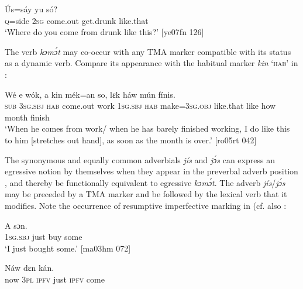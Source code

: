 \ea%
    \label{ex:key:356}
    \gll \'{U}s=sáy  yu      só?\\
\textsc{q}=side  \textsc{2sg}  come.out  get.drunk  like.that\\

\glt ‘Where do you come from drunk like this?’ [ye07fn 126]
\z

The verb \textit{kɔmɔ́t} may co-occur with any TMA marker compatible with its status as a dynamic verb. Compare its appearance with the habitual marker \textit{kin} ‘\textsc{hab}’ in :


\ea%
    \label{ex:key:357}
    \gll Wé  e         wók,  a    kin
mék=an    so,    lɛk  háw  mún    fínis.\\
\textsc{sub}  \textsc{3sg.sbj}  \textsc{hab}  come.out  work  \textsc{1sg.sbj}  \textsc{hab}
make=\textsc{3sg.obj}  like.that  like  how  month  finish\\

\glt ‘When he comes from work/ when he has barely finished working, I do like 
this to him [stretches out hand], as soon as the month is over.’ [ro05rt 042]
\z

The synonymous and equally common adverbials \textit{jís} and \textit{jɔ́s} can express an egressive notion by themselves when they appear in the preverbal adverb position , and thereby be functionally equivalent to egressive \textit{kɔmɔ́t}. The adverb \textit{jís}{{/}}\textit{jɔ́s} may be preceded by a TMA marker and be followed by the lexical verb that it modifies. Note the occurrence of resumptive imperfective marking in  (cf. also :


\ea%
    \label{ex:key:358}
    \gll A      sɔn.\\
\textsc{1sg.sbj}  just  buy  some\\

\glt ‘I just bought some.’ [ma03hm 072]
\z


\ea%
    \label{ex:key:359}
    \gll Náw    dɛn        kán.\\
now    \textsc{3pl}  \textsc{ipfv}  just  \textsc{ipfv}  come\\

